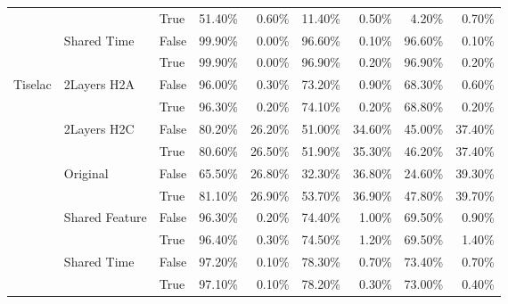\begin{tabular}{lllrrrrrr}
 &  & True & 51.40\% & 0.60\% & 11.40\% & 0.50\% & 4.20\% & 0.70\% \\
\cline{2-9}
 & \multirow[t]{2}{*}{Shared Time} & False & 99.90\% & 0.00\% & 96.60\% & 0.10\% & 96.60\% & 0.10\% \\
 &  & True & 99.90\% & 0.00\% & 96.90\% & 0.20\% & 96.90\% & 0.20\% \\
\cline{1-9} \cline{2-9}
\multirow[t]{10}{*}{Tiselac} & \multirow[t]{2}{*}{2Layers H2A} & False & 96.00\% & 0.30\% & 73.20\% & 0.90\% & 68.30\% & 0.60\% \\
 &  & True & 96.30\% & 0.20\% & 74.10\% & 0.20\% & 68.80\% & 0.20\% \\
\cline{2-9}
 & \multirow[t]{2}{*}{2Layers H2C} & False & 80.20\% & 26.20\% & 51.00\% & 34.60\% & 45.00\% & 37.40\% \\
 &  & True & 80.60\% & 26.50\% & 51.90\% & 35.30\% & 46.20\% & 37.40\% \\
\cline{2-9}
 & \multirow[t]{2}{*}{Original} & False & 65.50\% & 26.80\% & 32.30\% & 36.80\% & 24.60\% & 39.30\% \\
 &  & True & 81.10\% & 26.90\% & 53.70\% & 36.90\% & 47.80\% & 39.70\% \\
\cline{2-9}
 & \multirow[t]{2}{*}{Shared Feature} & False & 96.30\% & 0.20\% & 74.40\% & 1.00\% & 69.50\% & 0.90\% \\
 &  & True & 96.40\% & 0.30\% & 74.50\% & 1.20\% & 69.50\% & 1.40\% \\
\cline{2-9}
 & \multirow[t]{2}{*}{Shared Time} & False & 97.20\% & 0.10\% & 78.30\% & 0.70\% & 73.40\% & 0.70\% \\
 &  & True & 97.10\% & 0.10\% & 78.20\% & 0.30\% & 73.00\% & 0.40\% \\
\cline{1-9} \cline{2-9}
\bottomrule
\end{tabular}
